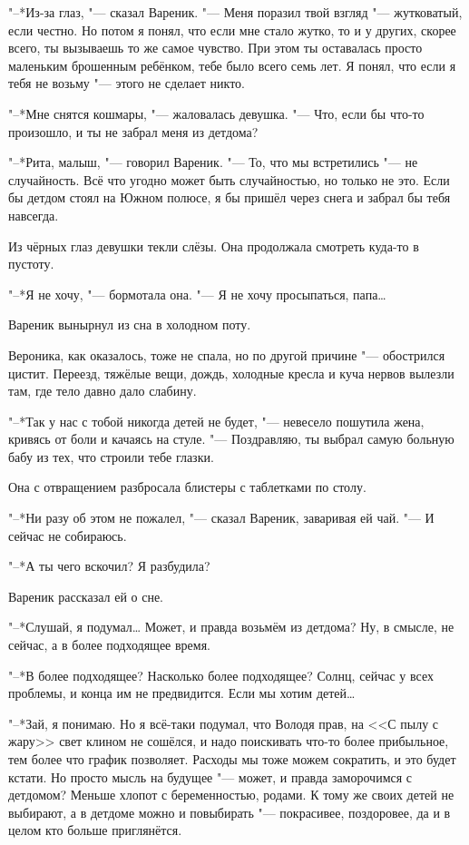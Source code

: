 "--*Из-за глаз, "--- сказал Вареник.
"--- Меня поразил твой взгляд "--- жутковатый, если честно.
Но потом я понял, что если мне стало жутко, то и у других, скорее всего, ты вызываешь то же самое чувство.
При этом ты оставалась просто маленьким брошенным ребёнком, тебе было всего семь лет.
Я понял, что если я тебя не возьму "--- этого не сделает никто.

"--*Мне снятся кошмары, "--- жаловалась девушка.
"--- Что, если бы что-то произошло, и ты не забрал меня из детдома?

"--*Рита, малыш, "--- говорил Вареник.
"--- То, что мы встретились "--- не случайность.
Всё что угодно может быть случайностью, но только не это.
Если бы детдом стоял на Южном полюсе, я бы пришёл через снега и забрал бы тебя навсегда.

Из чёрных глаз девушки текли слёзы.
Она продолжала смотреть куда-то в пустоту.

"--*Я не хочу, "--- бормотала она.
"--- Я не хочу просыпаться, папа\ldots{}

Вареник вынырнул из сна в холодном поту.

Вероника, как оказалось, тоже не спала, но по другой причине "--- обострился цистит.
Переезд, тяжёлые вещи, дождь, холодные кресла и куча нервов вылезли там, где тело давно дало слабину.

"--*Так у нас с тобой никогда детей не будет, "--- невесело пошутила жена, кривясь от боли и качаясь на стуле.
"--- Поздравляю, ты выбрал самую больную бабу из тех, что строили тебе глазки.

Она с отвращением разбросала блистеры с таблетками по столу.

"--*Ни разу об этом не пожалел, "--- сказал Вареник, заваривая ей чай.
"--- И сейчас не собираюсь.

"--*А ты чего вскочил?
Я разбудила?

Вареник рассказал ей о сне.

"--*Слушай, я подумал\ldots{}
Может, и правда возьмём из детдома?
Ну, в смысле, не сейчас, а в более подходящее время.

"--*В более подходящее?
Насколько более подходящее?
Солнц, сейчас у всех проблемы, и конца им не предвидится.
Если мы хотим детей\ldots{}

"--*Зай, я понимаю.
Но я всё-таки подумал, что Володя прав, на <<С пылу с жару>> свет клином не сошёлся, и надо поискивать что-то более прибыльное, тем более что график позволяет.
Расходы мы тоже можем сократить, и это будет кстати.
Но просто мысль на будущее "--- может, и правда заморочимся с детдомом?
Меньше хлопот с беременностью, родами.
К тому же своих детей не выбирают, а в детдоме можно и повыбирать "--- покрасивее, поздоровее, да и в целом кто больше приглянётся.

